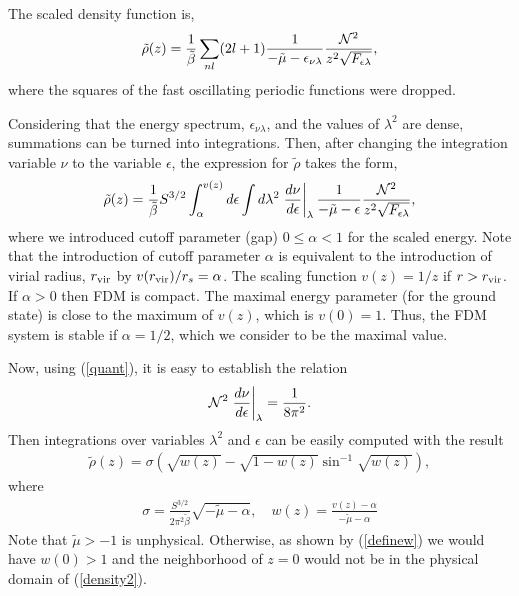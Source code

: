 \documentclass[aps,prl,twocolumn]{revtex4}
\begin{document}
 The scaled density function is,
\begin{align*}
   \tilde \rho(z)=\frac{1}{\tilde\beta}\sum_{nl}(2l+1)\frac{1}{-\tilde\mu-\epsilon_{\nu\lambda}}\frac{{\cal N}^2}{z^2\sqrt{F_{\epsilon\lambda}}},
\end{align*}
where the squares of the fast oscillating periodic functions were dropped.

Considering that the energy spectrum, $\epsilon_{\nu\lambda}$, and the values of $\lambda^2$ are dense, summations can be turned into integrations. Then, after changing the integration variable $\nu$ to the variable $\epsilon$, the expression for $\tilde\rho$ takes the form,
\begin{align*}
\tilde  \rho(z)=\frac{1}{\tilde\beta}S^{3/2}\int_{\alpha}^{v(z)} d\epsilon\int d\lambda^2 \left.\frac{d\nu}{d\epsilon}\right|_\lambda\frac{1}{-\tilde\mu-\epsilon}\frac{{\cal N}^2}{z^2\sqrt{F_{\epsilon\lambda}}},
\end{align*}
where we introduced cutoff parameter (gap) $0\leq\alpha<1$ for the scaled energy. Note that the introduction of cutoff parameter $\alpha$ is equivalent to the introduction of virial radius, $r_{\rm vir}$ by $v(r_{\rm vir})/r_s=\alpha$.  The scaling function $v(z)=1/z$ if $r>r_{\rm vir}$. If $\alpha>0$ then FDM is compact. The maximal energy parameter (for the ground state) is close to the maximum of $v(z)$, which is $v(0)=1$. Thus, the FDM system is stable if $\alpha=1/2$, which we consider to be the maximal value. 

Now, using (\ref{quant}), it is easy to establish the relation
\begin{align*}
    {\cal N}^2\left.\frac{d\nu}{d\epsilon}\right|_\lambda=\frac{1}{8\pi^2}.
\end{align*}
Then integrations over variables $\lambda^2$ and $\epsilon$ can be easily computed with the result
\begin{align}\label{density2}
    \tilde\rho(z)=\sigma\left(\sqrt{w(z)}-\sqrt{1-w(z)}\sin^{-1}\sqrt{w(z)}\right),
\end{align}
where
\begin{align}\label{definew}
\sigma=\frac{S^{3/2}}{2\pi^2\tilde\beta}\sqrt{-\tilde\mu-\alpha},\quad w(z)=\frac{v(z)-\alpha}{-\tilde\mu-\alpha}
  \end{align}
  Note that $\tilde\mu>-1$ is unphysical. Otherwise, as shown by (\ref{definew}) we would have $w(0)>1$ and the neighborhood of $z=0$ would not be in the physical domain of (\ref{density2}).
\end{document}
